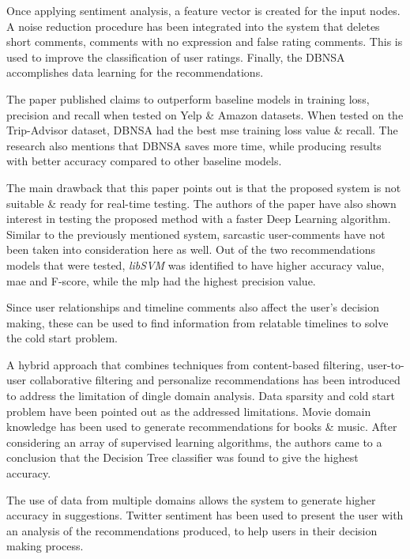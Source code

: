 Once applying sentiment analysis, a feature vector is created for the input nodes. A noise reduction procedure has been integrated into the system that deletes short comments, comments with no expression and false rating comments. This is used to improve the classification of user ratings. Finally, the DBNSA accomplishes data learning for the recommendations.

The paper published claims to outperform baseline models in training loss, precision and recall when tested on Yelp \& Amazon datasets. When tested on the Trip-Advisor dataset, DBNSA had the best \gls{mse} training loss value \& recall. The research also mentions that DBNSA saves more time, while producing results with better accuracy compared to other baseline models.

The main drawback that this paper points out is that the proposed system is not suitable \& ready for real-time testing. The authors of the paper have also shown interest in testing the proposed method with a faster Deep Learning algorithm. Similar to the previously mentioned system, sarcastic user-comments have not been taken into consideration here as well.
Out of the two recommendations models that were tested, \emph{libSVM} was identified to have higher accuracy value, \gls{mae} and F-score, while the \gls{mlp} had the highest precision value.

Since user relationships and timeline comments also affect the user's decision making, these can be used to find information from relatable timelines to solve the cold start problem.

\bigbreak
A hybrid approach that combines techniques from content-based filtering, user-to-user collaborative filtering and personalize recommendations \autocite{ayushi_cross-domain_2018} has been introduced to address the limitation of dingle domain analysis. Data sparsity and cold start problem have been pointed out as the addressed limitations. Movie domain knowledge has been used to generate recommendations for books \& music. 
After considering an array of supervised learning algorithms, the authors came to a conclusion that the Decision Tree classifier was found to give the highest accuracy.

The use of data from multiple domains allows the system to generate higher accuracy in suggestions. Twitter sentiment has been used to present the user with an analysis of the recommendations produced, to help users in their decision making process.

